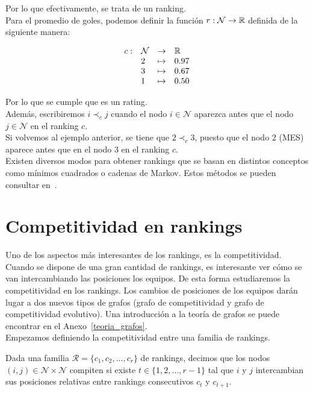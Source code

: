 Por lo que efectivamente, se trata de un ranking.\\

Para el promedio de goles, podemos definir la función $r : \mathcal{N} \to \mathbb{R}$ definida de la siguiente manera:

\[ \begin{array}{rlll}
c: & \mathcal{N} & \to & \mathbb{R}\\
& 2 & \mapsto & 0.97\\
& 3 & \mapsto & 0.67\\
& 1 & \mapsto & 0.50
\end{array} \] 

Por lo que se cumple que es un rating.\\

Además, escribiremos $i \prec_c j$ cuando el nodo $i \in \mathcal{N}$ aparezca antes que el nodo $j \in \mathcal{N}$ en el ranking $c$.\\

Si volvemos al ejemplo anterior, se tiene que $2 \prec_c 3$, puesto que el nodo $2$ (MES) aparece antes que en el nodo $3$ en el ranking $c$.\\

Existen diversos modos para obtener rankings que se basan en distintos conceptos como mínimos cuadrados o cadenas de Markov. Estos métodos se pueden consultar en~\cite{langville2012s}.

\section{Competitividad en rankings}

Uno de los aspectos más interesantes de los rankings, es la competitividad. Cuando se dispone de una gran cantidad de rankings, es interesante ver cómo se van intercambiando las posiciones los equipos. De esta forma estudiaremos la competitividad en los rankings. Los cambios de posiciones de los equipos darán lugar a dos nuevos tipos de grafos (grafo de competitividad y grafo de competitividad evolutivo). Una introducción a la teoría de grafos se puede encontrar en el Anexo~\ref{teoria_grafos}.\\

Empezamos definiendo la competitividad entre una familia de rankings.

\begin{defi}
Dada una familia $\mathcal{R} = \{c_1, c_2, \dots, c_r\}$ de rankings, decimos que los nodos $(i,j) \in \mathcal{N} \times \mathcal{N}$ compiten si existe $t \in \{1,2,\dots, r-1\}$ tal que $i$ y $j$ intercambian sus posiciones relativas entre rankings consecutivos $c_t$ y $c_{t+1}$.
\end{defi}


